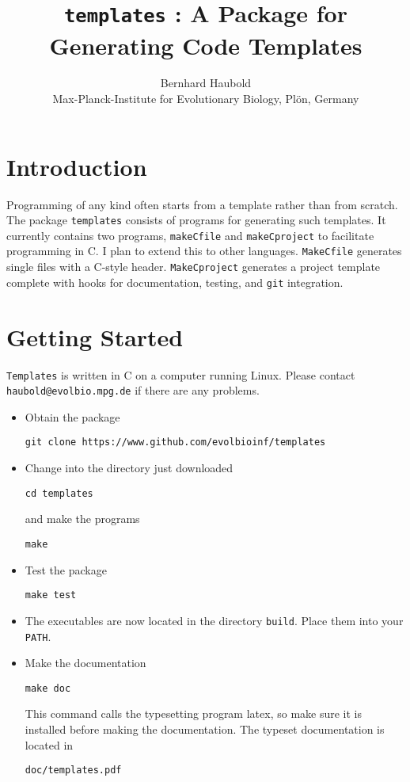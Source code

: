 \documentclass[a4paper, english]{article}
\begin{document}
\title{\texttt{templates} : A Package for Generating
  Code Templates}
\author{Bernhard Haubold\\\small Max-Planck-Institute for Evolutionary
  Biology, Pl\"on, Germany}
\date{}
\maketitle
\section{Introduction} 
Programming of any kind often starts from a template rather than from
scratch. The package \texttt{templates} consists of programs for
generating such templates. It currently contains two programs,
\texttt{makeCfile} and \texttt{makeCproject} to facilitate programming
in C. I plan to extend this to other languages. \texttt{MakeCfile}
generates single files with a C-style header. \texttt{MakeCproject}
generates a project template complete with hooks for documentation,
testing, and \texttt{git} integration.

\section{Getting Started}
\texttt{Templates} is written in C on a computer running Linux.
Please contact \texttt{haubold@evolbio.mpg.de} if there are any problems.
\begin{itemize}
\item Obtain the package
\begin{verbatim}
git clone https://www.github.com/evolbioinf/templates
\end{verbatim}
\item Change into the directory just downloaded
\begin{verbatim}
cd templates
\end{verbatim}
and make the programs
\begin{verbatim}
make
\end{verbatim}
\item Test the package
\begin{verbatim}
make test
\end{verbatim}
\item The executables are now located in the directory
  \texttt{build}. Place them into your \texttt{PATH}.
\item  Make the documentation
\begin{verbatim}
make doc
\end{verbatim}
This command calls the typesetting program latex, so make sure it is
installed before making the documentation. The typeset documentation
is located in
\begin{verbatim}
doc/templates.pdf
\end{verbatim}
\end{itemize}
\end{document}
